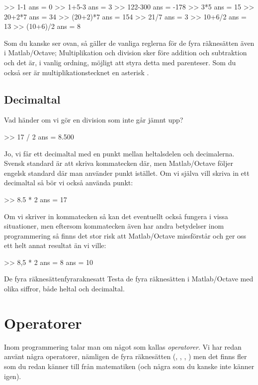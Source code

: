 \begin{matlab}[caption={De fyra räknesätten},label={}]
>> 1-1
ans = 0
>> 1+5-3
ans = 3
>> 122-300
ans = -178
>> 3*5
ans = 15
>> 20+2*7
ans = 34
>> (20+2)*7
ans = 154
>> 21/7
ans = 3
>> 10+6/2
ans = 13
>> (10+6)/2
ans = 8
\end{matlab}

Som du kanske ser ovan, så gäller de vanliga reglerna för de fyra räknesätten även i Matlab/Octave; Multiplikation och division sker före addition och subtraktion och det är, i vanlig ordning, möjligt att styra detta med parenteser. Som du också ser är multiplikationstecknet en asterisk \cw{*}.


\subsection{Decimaltal}

Vad händer om vi gör en division som inte går jämnt upp?

\begin{matlab}[caption={Decimaltal},label={}]
>> 17 / 2
ans = 8.500
\end{matlab}

Jo, vi får ett decimaltal med en punkt mellan heltalsdelen och decimalerna. Svensk standard är att skriva kommatecken där, men Matlab/Octave följer engelsk standard där man använder punkt istället. Om vi själva vill skriva in ett decimaltal så bör vi också använda punkt:

\begin{matlab}[caption={Decimaltal skrivs med punkt},label={}]
>> 8.5 * 2
ans = 17
\end{matlab}

Om vi skriver in kommatecken så kan det eventuellt också fungera i vissa situationer, men eftersom kommatecken även har andra betydelser inom programmering så finns det stor risk att Matlab/Octave missförstår och ger oss ett helt annat resultat än vi ville:

\begin{matlab}[caption={Varning för kommatecken},label={}]
>> 8,5 * 2
ans = 8
ans = 10
\end{matlab}


\begin{matteovning}{De fyra räknesätten}{fyraraknesatt}
Testa de fyra räknesätten i Matlab/Octave med olika siffror, både heltal och decimaltal.
\end{matteovning}

\section{Operatorer}\label{sec:operatorer}
Inom programmering talar man om något som kallas \emph{operatorer}. Vi har redan använt några operatorer, nämligen de fyra räknesätten (\cw{+}, \cw{-}, \cw{*}, \cw{/}) men det finns fler som du redan känner till från matematiken (och några som du kanske inte känner igen).

